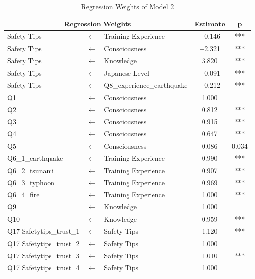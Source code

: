 \iffalse
\begin{table}[h]
  \caption{Regression Weights of Model 2}
  \label{table11}
  \centering
  \begin{tabular}{|l|c|l|c|c|}
 \hline
 \multicolumn{3}{|c|}{Regression Weights} & Estimate & p \\
 \hline
  Safety Tips & $\longleftarrow$ & Training Experience & $-$0.146 & *** \\
  Safety Tips & $\longleftarrow$ & Consciousness & $-$2.321 & *** \\
  Safety Tips & $\longleftarrow$ & Knowledge & 3.820 & *** \\
  Safety Tips & $\longleftarrow$ & Japanese Level & $-$0.091 & *** \\
  Safety Tips & $\longleftarrow$ & Q8\_experience\_earthquake & $-$0.212 & *** \\
  Q1              & $\longleftarrow$ & Consciousness & 1.000 &  \\
  Q2              & $\longleftarrow$ & Consciousness & 0.812 & *** \\
  Q3              & $\longleftarrow$ & Consciousness & 0.915 & *** \\
  Q4              & $\longleftarrow$ & Consciousness & 0.647 & *** \\
  Q5              & $\longleftarrow$ & Consciousness & 0.086 & 0.034 \\
  Q6\_1\_earthquake & $\longleftarrow$ & Training Experience & 0.990 & *** \\
  Q6\_2\_tsunami & $\longleftarrow$ & Training Experience & 0.907 & *** \\
  Q6\_3\_typhoon & $\longleftarrow$ & Training Experience & 0.969 & *** \\
  Q6\_4\_fire & $\longleftarrow$ & Training Experience & 1.000 & *** \\
  Q9             & $\longleftarrow$ & Knowledge & 1.000 & \\
  Q10           & $\longleftarrow$ & Knowledge & 0.959 & *** \\
  Q17 Safetytips\_trust\_1 & $\longleftarrow$ & Safety Tips & 1.120 & *** \\
  Q17 Safetytips\_trust\_2 & $\longleftarrow$ & Safety Tips & 1.000 & \\
  Q17 Safetytips\_trust\_3 & $\longleftarrow$ & Safety Tips & 1.010 & *** \\
  Q17 Safetytips\_trust\_4 & $\longleftarrow$ & Safety Tips & 1.000 & \\
 \hline
  \end{tabular}
\end{table}

